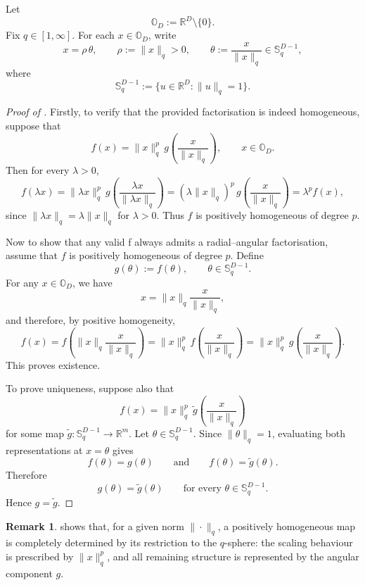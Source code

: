 \documentclass{article}
\theoremstyle{definition}
\newtheorem{remark}[theorem]{Remark}
\begin{document}
Let
\[
\mathbb{O}_D := \mathbb{R}^D \setminus \{0\}.
\]
Fix \(q \in [1,\infty]\). For each \(x \in \mathbb{O}_D\), write
\[
x = \rho\,\theta,
\qquad
\rho := \|x\|_{q} > 0,
\qquad
\theta := \frac{x}{\|x\|_{q}} \in \mathbb{S}^{D-1}_{q},
\]
where
\[
\mathbb{S}^{D-1}_{q} := \{u \in \mathbb{R}^D : \|u\|_{q} = 1\}.
\]

\begin{proof}[Proof of ]
Firstly, to verify that the provided factorisation is indeed homogeneous, suppose that
\[
f(x) = \|x\|_{q}^p\, g\!\left(\frac{x}{\|x\|_{q}}\right),
\qquad x \in \mathbb{O}_D.
\]
Then for every \(\lambda > 0\),
\[
f(\lambda x)
=
\|\lambda x\|_{q}^p\, g\!\left(\frac{\lambda x}{\|\lambda x\|_{q}}\right)
=
(\lambda \|x\|_{q})^p\, g\!\left(\frac{x}{\|x\|_{q}}\right)
=
\lambda^p f(x),
\]
since \(\|\lambda x\|_{q} = \lambda \|x\|_{q}\) for \(\lambda > 0\). Thus \(f\) is positively homogeneous of degree \(p\).

Now to show that any valid f always admits a radial--angular factorisation, assume that \(f\) is positively homogeneous of degree \(p\). Define
\[
g(\theta) := f(\theta),
\qquad \theta \in \mathbb{S}^{D-1}_{q}.
\]
For any \(x \in \mathbb{O}_D\), we have
\[
x = \|x\|_{q} \frac{x}{\|x\|_{q}},
\]
and therefore, by positive homogeneity,
\[
f(x)
=
f\!\left(\|x\|_{q} \frac{x}{\|x\|_{q}}\right)
=
\|x\|_{q}^p\, f\!\left(\frac{x}{\|x\|_{q}}\right)
=
\|x\|_{q}^p\, g\!\left(\frac{x}{\|x\|_{q}}\right).
\]
This proves existence.

To prove uniqueness, suppose also that
\[
f(x) = \|x\|_{q}^p\, \tilde g\!\left(\frac{x}{\|x\|_{q}}\right)
\]
for some map \(\tilde g : \mathbb{S}^{D-1}_{q} \to \mathbb{R}^m\). Let
\(\theta \in \mathbb{S}^{D-1}_{q}\). Since \(\|\theta\|_{q} = 1\), evaluating both
representations at \(x=\theta\) gives
\[
f(\theta)=g(\theta)
\qquad\text{and}\qquad
f(\theta)=\tilde g(\theta).
\]
Therefore
\[
g(\theta)=\tilde g(\theta)
\qquad
\text{for every } \theta \in \mathbb{S}^{D-1}_{q}.
\]
Hence \(g=\tilde g\).
\end{proof}

\begin{remark}
 shows that, for a given norm
\(\|\cdot\|_{q}\), a positively homogeneous map is completely determined by its
restriction to the \(q\)-sphere: the scaling behaviour is prescribed by \(\|x\|_{q}^p\), and all remaining structure is represented by the angular component \(g\).
\end{remark}
\end{document}
